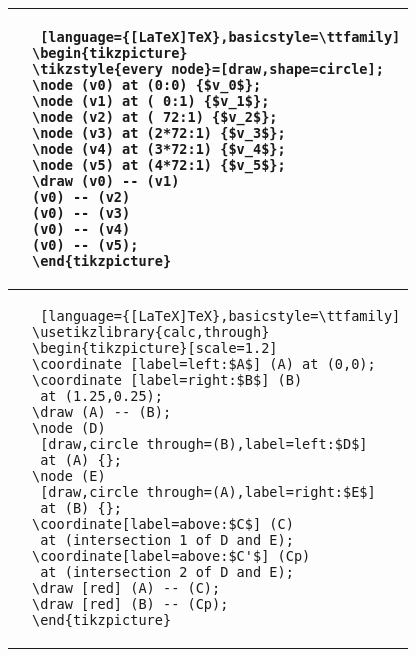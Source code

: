 \begin{note}[Nodes]
\begin{itemize}
\begin{tabular}{c|l}
\begin{tikzpicture}
\tikzstyle{every node}=[draw,shape=circle];
\node (v0) at (0:0) {$v_0$};
\node (v1) at ( 0:1) {$v_1$};
\node (v2) at ( 72:1) {$v_2$};
\node (v3) at (2*72:1) {$v_3$};
\node (v4) at (3*72:1) {$v_4$};
\node (v5) at (4*72:1) {$v_5$};
\draw (v0) -- (v1)
(v0) -- (v2)
(v0) -- (v3)
(v0) -- (v4)
(v0) -- (v5);
\end{tikzpicture} &
\begin{lstlisting} [language={[LaTeX]TeX},basicstyle=\ttfamily]
\begin{tikzpicture}
\tikzstyle{every node}=[draw,shape=circle];
\node (v0) at (0:0) {$v_0$};
\node (v1) at ( 0:1) {$v_1$};
\node (v2) at ( 72:1) {$v_2$};
\node (v3) at (2*72:1) {$v_3$};
\node (v4) at (3*72:1) {$v_4$};
\node (v5) at (4*72:1) {$v_5$};
\draw (v0) -- (v1)
(v0) -- (v2)
(v0) -- (v3)
(v0) -- (v4)
(v0) -- (v5);
\end{tikzpicture}
\end{lstlisting}\\
\hline
\begin{tikzpicture}
\coordinate [label=left:$A$] (A) at (0,0);
\coordinate [label=right:$B$] (B) at (1.25,0.25);
\draw (A) -- (B);
\node (D) [draw,circle through=(B),label=left:$D$] at (A) {};
\node (E) [draw,circle through=(A),label=right:$E$] at (B) {};
\coordinate[label=above:$C$] (C) at (intersection 1 of D and E);
\coordinate[label=above:$C'$] (Cp) at (intersection 2 of D and E);
\draw [red] (A) -- (C);
\draw [red] (B) -- (Cp);
\end{tikzpicture} &
\begin{lstlisting} [language={[LaTeX]TeX},basicstyle=\ttfamily]
\usetikzlibrary{calc,through}
\begin{tikzpicture}[scale=1.2]
\coordinate [label=left:$A$] (A) at (0,0);
\coordinate [label=right:$B$] (B) 
 at (1.25,0.25);
\draw (A) -- (B);
\node (D) 
 [draw,circle through=(B),label=left:$D$]
 at (A) {};
\node (E) 
 [draw,circle through=(A),label=right:$E$]
 at (B) {};
\coordinate[label=above:$C$] (C) 
 at (intersection 1 of D and E);
\coordinate[label=above:$C'$] (Cp) 
 at (intersection 2 of D and E);
\draw [red] (A) -- (C);
\draw [red] (B) -- (Cp);
\end{tikzpicture}
\end{lstlisting}
\end{tabular}
\end{itemize}
\end{note}
	
